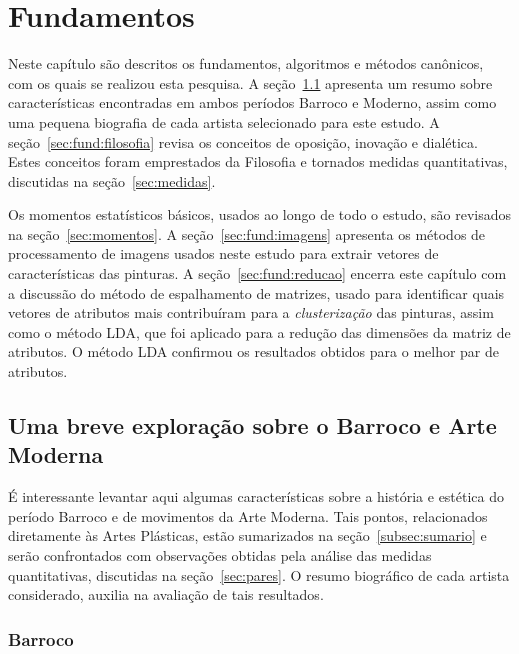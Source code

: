 
\afterpage{\blankpage}
\chapter{Fundamentos}
\label{cap:fundamentos}

Neste capítulo são descritos os fundamentos, algoritmos e métodos
canônicos, com os quais se realizou esta pesquisa. A
seção~\ref{sec:breve} apresenta um resumo sobre características
encontradas em ambos períodos Barroco e Moderno, assim como uma
pequena biografia de cada artista selecionado para este estudo. A
seção~\ref{sec:fund:filosofia} revisa os conceitos de oposição,
inovação e dialética. Estes conceitos foram emprestados da Filosofia e
tornados medidas quantitativas, discutidas na seção~\ref{sec:medidas}.

Os momentos estatísticos básicos, usados ao longo de todo o estudo,
são revisados na seção~\ref{sec:momentos}. A
seção~\ref{sec:fund:imagens} apresenta os métodos de processamento de
imagens usados neste estudo para extrair vetores de características
das pinturas. A seção~\ref{sec:fund:reducao} encerra este capítulo com
a discussão do método de espalhamento de matrizes, usado para
identificar quais vetores de atributos mais contribuíram para
a \textit{clusterização} das pinturas, assim como o método LDA, que
foi aplicado para a redução das dimensões da matriz de atributos. O
método LDA confirmou os resultados obtidos para o melhor par de
atributos.

\section{Uma breve exploração sobre o Barroco e Arte Moderna}
\label{sec:breve}

É interessante levantar aqui algumas características sobre a história
e estética do período Barroco e de movimentos da Arte Moderna. Tais
pontos, relacionados diretamente às Artes Plásticas, estão sumarizados
na seção~\ref{subsec:sumario} e serão confrontados com observações
obtidas pela análise das medidas quantitativas, discutidas na
seção~\ref{sec:pares}. O resumo biográfico de cada artista
considerado, auxilia na avaliação de tais resultados.

\subsection{Barroco}

